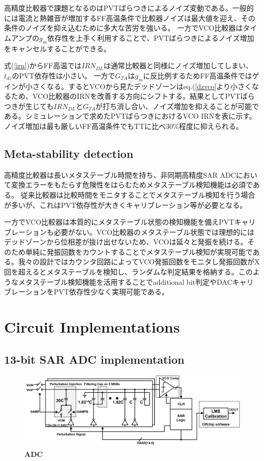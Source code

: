 \documentclass[letterpaper, 10 pt, conference]{ieeeconf}  %
\begin{document}
高精度比較器で課題となるのはPVTばらつきによるノイズ変動である。一般的には電流と熱雑音が増加するFF高温条件で比較器ノイズは最大値を迎え、その条件のノイズを抑え込むために多大な苦労を強いる。
一方でVCO比較器はタイムアンプの$g_m$依存性を上手く利用することで、PVTばらつきによるノイズ増加をキャンセルすることができる。

式(\ref{irn})からFF高温では$IRN_{DL}$は通常比較器と同様にノイズ増加してしまい、$t_{dz}$のPVT依存性は小さい。
一方で$G_{TA}$は$g_m$に反比例するためFF高温条件ではゲインが小さくなる。するとVCOから見たデッドゾーンはeq.(\ref{dzvco}より小さくなるため、VCO比較器のIRNを改善する方向にシフトする。結果としてPVTばらつきが生じても$IRN_{DL}$と$G_{TA}$が打ち消し合い、ノイズ増加を抑えることが可能である。シミュレーションで求めたPVTばらつきにおけるVCO IRNを表に示す。ノイズ増加は最も厳しいFF高温条件でもTTに比べ30\%程度に抑えられる。

\subsection{Meta-stability detection}
高精度比較器は長いメタステーブル時間を持ち、非同期高精度SAR ADCにおいて変換エラーをもたらす危険性をはらむためメタステーブル検知機能は必須である。
従来比較器は比較時間をモニタすることでメタステーブル検知を行う場合が多いが、これはPVT依存性が大きくキャリブレーション等が必要となる\cite{shikata20120}。

一方でVCO比較器は本質的にメタステーブル状態の検知機能を備えPVTキャリブレーションも必要がない。VCO比較器のメタステーブル状態では理想的にはデッドゾーンから位相差が抜け出せないため、VCOは延々と発振を続ける。そのため単純に発振回数をカウントすることでメタステーブル検知が実現可能である。我々の設計ではカウンタ回路によってVCO発振回数をモニタし発振回数がX回を超えるとメタステーブルを検知し、ランダムな判定結果を格納する。このようなメタステーブル検知機能を活用することでadditional bit判定\cite{shikata20120,ding20190}やDACキャリブレーション\cite{zhu201914}をPVT依存性少なく実現可能である。

\section{Circuit Implementations}
\subsection{13-bit SAR ADC implementation}

\begin{figure}[ht!]
\centering
 \includegraphics[width=1\textwidth]{figs/fig7.png}
  \captionsetup{font=footnotesize}
  \caption{\textbf{ADC}}
  \label{13bsar}
\end{figure}
\end{document}

